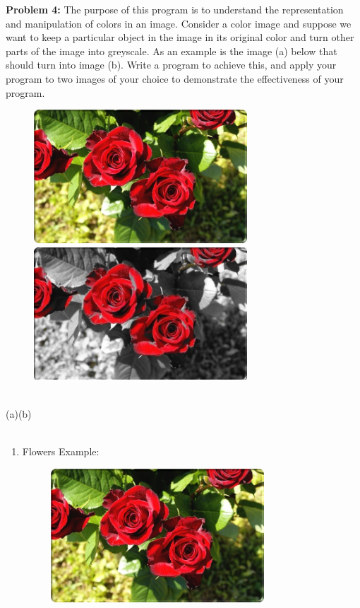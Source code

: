 \documentclass[11pt]{article}
\newenvironment{problem}[1]{\textbf{Problem #1: }}{\newpage}
\begin{document}
	\begin{problem}{4}
		The purpose of this program is to understand the representation and manipulation of colors in an image. Consider a color image and suppose we want to keep a particular object in the image in its original color and turn other parts of the image into greyscale. As an example is the image (a) below that should turn into image (b). Write a program to achieve this, and apply your program to two images of your choice to demonstrate the effectiveness of your program.
		\begin{figure}[h!]
			\includegraphics[width = 8cm, height = 5cm]{../Photos/FlowersFullColor.jpg}
			\hspace{.75cm}
			\includegraphics[width = 8cm, height = 5cm]{../Photos/FlowersRedRoses.jpg}
		\end{figure}
		\\
		\text{}\hspace{4cm}(a)\hspace{8.75cm}(b)
		\\ \\
		\begin{enumerate}
			\item Flowers Example:
			\begin{figure}[h!]
				\includegraphics[width = 8cm, height = 5cm]{../Photos/FlowersFullColor.jpg}

\end{figure}
\end{enumerate}
\end{problem}
\end{document}
